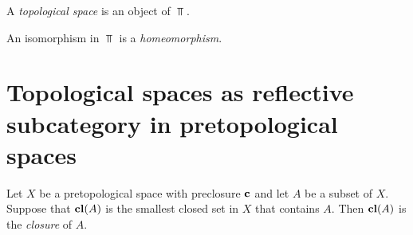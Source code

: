 \begin{definition}
	A \textit{topological space} is an object of $\Top$.
\end{definition}

\begin{definition}
	An isomorphism in $\Top$ is a \textit{homeomorphism}.
\end{definition}

\section{Topological spaces as reflective subcategory in pretopological spaces}

\begin{definition}
	Let $X$ be a pretopological space with preclosure $\mathbf{c}$ and let $A$ be a subset of $X$. Suppose that $\mathbf{cl}(A)$ is the smallest closed set in $X$ that contains $A$. Then $\mathbf{cl}(A)$ is the \textit{closure} of $A$.
\end{definition}

